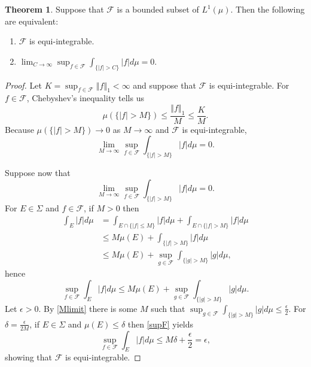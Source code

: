 \documentclass{article}
\newcommand{\norm}[1]{\left\Vert #1 \right\Vert}
\theoremstyle{definition}
\newtheorem{theorem}{Theorem}
\theoremstyle{definition}
\begin{document}
\begin{theorem}
Suppose that $\mathscr{F}$ is a bounded subset of $L^1(\mu)$. Then the following are equivalent:
\begin{enumerate}
\item $\mathscr{F}$ is equi-integrable.
\item $\lim_{C \to \infty} \sup_{f \in \mathscr{F}} \int_{\{|f|>C\}} |f| d\mu =0$.
\end{enumerate}
\label{TFAE}
\end{theorem}
\begin{proof}
Let $K=\sup_{f \in \mathscr{F}} \norm{f}_1<\infty$ and suppose that
$\mathscr{F}$ is equi-integrable. For $f \in \mathscr{F}$,
Chebyshev's inequality tells us
\[
\mu(\{|f|>M\}) \leq \frac{\norm{f}_1}{M} \leq \frac{K}{M}.
\] 
Because $\mu(\{|f|>M\}) \to 0$ as $M \to \infty$ and $\mathscr{F}$ is equi-integrable,
\[
\lim_{M \to \infty} \sup_{f \in \mathscr{F}} \int_{\{|f|>M\}} |f| d\mu  = 0.
\]

Suppose now that
\begin{equation}
\lim_{M \to \infty} \sup_{f \in \mathscr{F}} \int_{\{|f|>M\}} |f| d\mu =0.
\label{Mlimit}
\end{equation}
For $E \in \Sigma$ and $f \in \mathscr{F}$, if $M>0$ then
\begin{align*}
\int_E |f| d\mu&=\int_{E \cap \{|f| \leq M\}} |f| d\mu + \int_{E \cap \{|f|>M\}} |f| d\mu\\
&\leq M \mu(E) + \int_{\{|f|>M\}} |f| d\mu\\
&\leq M \mu(E) + \sup_{g \in \mathscr{F}} \int_{\{|g|>M\}} |g| d\mu,
\end{align*}
hence
\begin{equation}
\sup_{f \in \mathscr{F}} \int_E |f| d\mu \leq M \mu(E) + \sup_{g \in \mathscr{F}} \int_{\{|g|>M\}} |g| d\mu.
\label{supF}
\end{equation}
Let $\epsilon>0$.
By \eqref{Mlimit} there is some $M$ such that 
$\sup_{g \in \mathscr{F}} \int_{\{|g|>M\}} |g| d\mu \leq \frac{\epsilon}{2}$. 
For $\delta=\frac{\epsilon}{2M}$, if $E \in \Sigma$ and $\mu(E) \leq \delta$ then \eqref{supF} yields
\[
\sup_{f \in \mathscr{F}} \int_E |f| d\mu \leq M\delta +  \frac{\epsilon}{2}
= \epsilon,
\]
showing that $\mathscr{F}$ is equi-integrable.
\end{proof}
\end{document}
